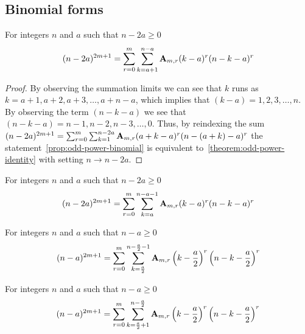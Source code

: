 \subsection{Binomial forms}\label{subsec:binomial-forms}

\begin{proposition}
    \label{prop:odd-power-binomial}
    For integers $n$ and $a$ such that $n-2a \geq 0$
    \begin{align*}
    (n-2a)^{2m+1} = \sum_{r=0}^{m} \sum_{k=a+1}^{n-a} {\mathbf{A}} \sb{m,r} (k-a)^r (n-k-a)^r
    \end{align*}
    \begin{proof}
        By observing the summation limits we can see that $k$ runs as $k=a+1,a+2,a+3,\ldots,a+n-a$, which
        implies that $(k-a)=1,2,3,\ldots, n$.
        By observing the term $(n-k-a)$ we see that $(n-k-a)=n-1,n-2,n-3,\ldots,0$.
        Thus, by reindexing the sum
        $(n-2a)^{2m+1} = \sum_{r=0}^{m} \sum_{k=1}^{n-2a} {\mathbf{A}} \sb{m,r} (a+k-a)^r (n-(a+k)-a)^r$
        the statement~\eqref{prop:odd-power-binomial} is equivalent to~\eqref{theorem:odd-power-identity}
        with setting $n \rightarrow n-2a$.
    \end{proof}
\end{proposition}

\begin{corollary}
    \label{prop:odd-power-binomial-shifted}
    For integers $n$ and $a$ such that $n-2a \geq 0$
    \begin{align*}
    (n-2a)^{2m+1} = \sum_{r=0}^{m} \sum_{k=a}^{n-a-1} {\mathbf{A}} \sb{m,r} (k-a)^r (n-k-a)^r
    \end{align*}
\end{corollary}

\begin{corollary}
    \label{cor:odd-power-binomial-symmetric}
    For integers $n$ and $a$ such that $n-a \geq 0$
    \begin{align*}
    (n-a)^{2m+1} = \sum_{r=0}^{m} \sum_{k=\frac{a}{2}}^{n-\frac{a}{2}-1} {\mathbf{A}} \sb{m,r} \left( k-\frac{a}{2} \right)^r \left(n-k-\frac{a}{2} \right)^r
    \end{align*}
\end{corollary}

\begin{corollary}
    \label{cor:odd-power-binomial-symmetric-shifted}
    For integers $n$ and $a$ such that $n-a \geq 0$
    \begin{align*}
    (n-a)^{2m+1} = \sum_{r=0}^{m} \sum_{k=\frac{a}{2}+1}^{n-\frac{a}{2}} {\mathbf{A}} \sb{m,r} \left( k-\frac{a}{2} \right)^r \left(n-k-\frac{a}{2} \right)^r
    \end{align*}
\end{corollary}

